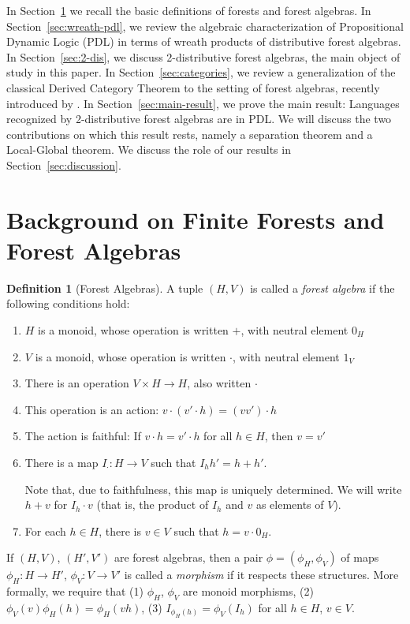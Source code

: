 \documentclass[sigplan,9pt]{acmart}\settopmatter{printfolios=true,printccs=false,printacmref=false}
\newcounter{thm}
\newcounter{theorem}
\theoremstyle{definition}
\newtheorem{defin}[thm]{Definition}
\begin{document}
In Section~\ref{sec:background} we recall the basic definitions of forests and forest algebras.
In Section~\ref{sec:wreath-pdl}, we review the algebraic characterization of Propositional Dynamic Logic (PDL) in terms of wreath products of distributive forest algebras.
In Section~\ref{sec:2-dis}, we discuss 2-distributive forest algebras, the main object of study in this paper.
In Section~\ref{sec:categories}, we review a generalization of the classical Derived Category Theorem to the setting of forest algebras, recently introduced by \cite{straubing-forest-2018}.
In Section~\ref{sec:main-result}, we prove the main result: Languages recognized by 2-distributive forest algebras are in PDL. We will discuss the two contributions on which this result rests, namely a separation theorem and a Local-Global theorem.
We discuss the role of our results in Section~\ref{sec:discussion}.



\section{Background on Finite Forests and Forest Algebras}\label{sec:background}

\begin{defin}[Forest Algebras]\label{def:forest-algebra}
A tuple $(H,V)$ is called a \emph{forest algebra} if the following conditions hold:
\begin{enumerate}
\item $H$ is a monoid, whose operation is written $+$, with neutral element $0_H$

\item $V$ is a monoid, whose operation is written $\cdot$, with neutral element $1_V$

\item There is an operation $V \times H \rightarrow H$, also written $\cdot$
\item This operation is an action: $v\cdot (v'\cdot h) = (vv')\cdot h$

\item The action is faithful: If $v\cdot h = v'\cdot h$ for all $h \in H$, then $v=v'$

\item There is a map $I_\cdot : H \rightarrow V$ such that $I_h h' = h+h'$.

Note that, due to faithfulness, this map is uniquely determined. We will write $h+v$ for $I_h \cdot v$ (that is, the product of $I_h$ and $v$ as elements of $V$).

\item For each $h \in H$, there is $v \in V$ such that $h = v\cdot 0_H$.
\end{enumerate}

If $(H,V)$, $(H',V')$ are forest algebras, then a pair $\phi = (\phi_H,\phi_V)$ of maps $\phi_H : H \rightarrow H'$, $\phi_V : V \rightarrow V'$ is called a \emph{morphism} if it respects these structures.
More formally, we require that (1) $\phi_H$, $\phi_V$ are monoid morphisms, (2) $\phi_V(v)\phi_H(h) = \phi_H(vh)$, (3) $I_{\phi_H(h)} = \phi_V(I_h)$ for all $h \in H$, $v \in V$.
\end{defin}
\end{document}
